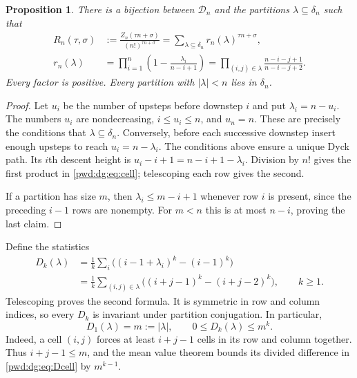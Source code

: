 \documentclass[11pt,letterpaper]{article}
\numberwithin{equation}{section}
\newtheorem{proposition}[theorem]{Proposition}
\theoremstyle{remark}\newtheorem{remark}[theorem]{Remark}
\newcommand{\D}{\mathcal D}
\begin{document}
\begin{proposition}\label{pwd:dg:prop:bijection}
There is a bijection between $\D_n$ and the partitions $\lambda\subseteq\delta_n$ such that
\begin{align}
 R_n(\tau,\sigma)&:=\frac{Z_n(\tau n+\sigma)}{(n!)^{\tau n+\sigma}}
 =\sum_{\lambda\subseteq\delta_n}r_n(\lambda)^{\tau n+\sigma},\label{pwd:dg:eq:partition}\\
 r_n(\lambda)&=\prod_{i=1}^n\left(1-\frac{\lambda_i}{n-i+1}\right)
 =\prod_{(i,j)\in\lambda}\frac{n-i-j+1}{n-i-j+2}.\label{pwd:dg:eq:cell}
\end{align}
Every factor is positive. Every partition with $|\lambda|<n$ lies in $\delta_n$.
\end{proposition}
\begin{proof}
Let $u_i$ be the number of upsteps before downstep $i$ and put $\lambda_i=n-u_i$. The numbers $u_i$ are nondecreasing, $i\le u_i\le n$, and $u_n=n$. These are precisely the conditions that $\lambda\subseteq\delta_n$. Conversely, before each successive downstep insert enough upsteps to reach $u_i=n-\lambda_i$. The conditions above ensure a unique Dyck path. Its $i$th descent height is $u_i-i+1=n-i+1-\lambda_i$. Division by $n!$ gives the first product in \eqref{pwd:dg:eq:cell}; telescoping each row gives the second.

If a partition has size $m$, then $\lambda_i\le m-i+1$ whenever row $i$ is present, since the preceding $i-1$ rows are nonempty. For $m<n$ this is at most $n-i$, proving the last claim.
\end{proof}

Define the statistics
\begin{align}
 D_k(\lambda)&=\frac1k\sum_i\bigl((i-1+\lambda_i)^k-(i-1)^k\bigr)\label{pwd:dg:eq:Drow}\\
 &=\frac1k\sum_{(i,j)\in\lambda}\bigl((i+j-1)^k-(i+j-2)^k\bigr),\qquad k\ge1.\label{pwd:dg:eq:Dcell}
\end{align}
Telescoping proves the second formula. It is symmetric in row and column indices, so every $D_k$ is invariant under partition conjugation. In particular,
\begin{equation}\label{pwd:dg:eq:Dbound}
 D_1(\lambda)=m:=|\lambda|,\qquad 0\le D_k(\lambda)\le m^k.
\end{equation}
Indeed, a cell $(i,j)$ forces at least $i+j-1$ cells in its row and column together. Thus $i+j-1\le m$, and the mean value theorem bounds its divided difference in \eqref{pwd:dg:eq:Dcell} by $m^{k-1}$.
\end{document}
